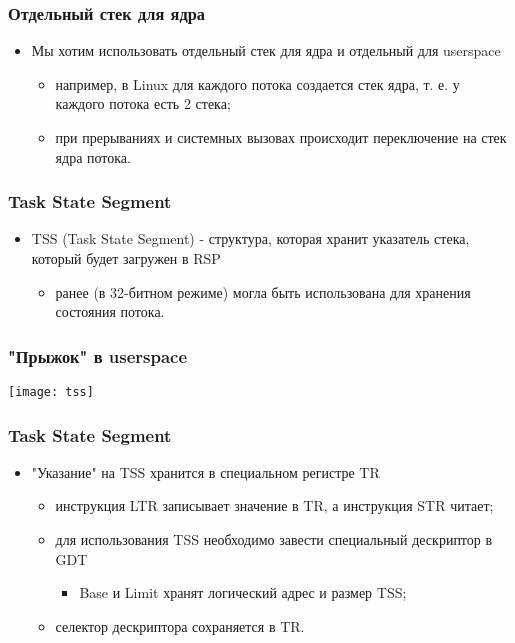 \begin{frame}
\frametitle{Отдельный стек для ядра}
\begin{itemize}
    \item<1->Мы хотим использовать отдельный стек для ядра и отдельный
         для userspace
    \begin{itemize}
        \item<2->например, в Linux для каждого потока создается стек
             ядра, т. е. у каждого потока есть 2 стека;
        \item<3->при прерываниях и системных вызовах происходит переключение
             на стек ядра потока.
    \end{itemize}
\end{itemize}
\end{frame}

\begin{frame}
\frametitle{Task State Segment}
\begin{itemize}
    \item<1->TSS (Task State Segment) - структура, которая хранит указатель
             стека, который будет загружен в RSP
    \begin{itemize}
        \item<2->ранее (в 32-битном режиме) могла быть использована для
             хранения состояния потока.
    \end{itemize}
\end{itemize}
\end{frame}

\begin{frame}
\frametitle{"Прыжок" в userspace}
\texttt{[image: tss]}
\end{frame}

\begin{frame}
\frametitle{Task State Segment}
\begin{itemize}
    \item<1->"Указание" на TSS хранится в специальном регистре TR
    \begin{itemize}
        \item<2->инструкция LTR записывает значение в TR, а инструкция
             STR читает;
        \item<3->для использования TSS необходимо завести специальный
             дескриптор в GDT
        \begin{itemize}
            \item<3->Base и Limit хранят логический адрес и размер TSS;
        \end{itemize}
        \item<4->селектор дескриптора сохраняется в TR.
    \end{itemize}
\end{itemize}
\end{frame}

